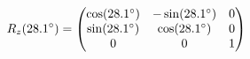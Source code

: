 \documentclass[preview]{standalone}
\begin{document}
\begin{align*}
\special{dvisvgm:raw <g id='unique000'>}R_z(28.1^\circ) = \begin{pmatrix} \cos(28.1^\circ) & -\sin(28.1^\circ) & 0 \\ \sin(28.1^\circ) & \cos(28.1^\circ) & 0 \\ 0 & 0 & 1 \end{pmatrix}\special{dvisvgm:raw </g>}
\end{align*}
\end{document}
